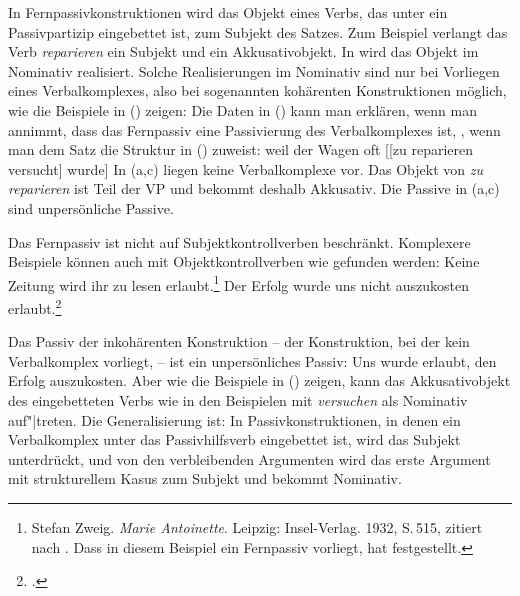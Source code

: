 In Fernpassivkonstruktionen wird das Objekt eines Verbs, das unter ein Passivpartizip eingebettet ist,
zum Subjekt des Satzes. Zum Beispiel verlangt das Verb \emph{reparieren} ein Subjekt und ein Akkusativobjekt.
In  wird das Objekt im Nominativ realisiert.
Solche Realisierungen im Nominativ sind nur bei Vorliegen eines Verbalkomplexes, also bei sogenannten
kohärenten Konstruktionen möglich, wie die Beispiele in () zeigen:
\eal
{}
\zl
Die Daten in () kann man erklären, wenn man annimmt, dass das Fernpassiv eine Passivierung
des Verbalkomplexes ist, \dash, wenn man dem Satz 
die Struktur in () zuweist:
\ea
weil    der Wagen     oft   [[zu reparieren versucht] wurde]
%
\z
In (a,c) liegen keine Verbalkomplexe vor. Das Objekt von \emph{zu reparieren} ist Teil der VP
und bekommt deshalb Akkusativ. Die Passive in (a,c) sind unpersönliche Passive.

Das Fernpassiv ist nicht auf Subjektkontrollverben beschränkt. Komplexere Beispiele
können auch mit Objektkontrollverben wie  gefunden werden:
\eal
\label{bsp-auskosten-fernpassiv}
\ex{}
Keine Zeitung         wird ihr       zu lesen erlaubt.\footnote{
        Stefan Zweig. \emph{Marie Antoinette}. Leipzig: Insel-Verlag. 1932, S.\,515, 
        zitiert nach . 
        Dass in diesem Beispiel ein Fernpassiv vorliegt, hat \citet[]{Askedal88} festgestellt.
}
\ex{}
Der Erfolg        wurde uns      nicht auszukosten erlaubt.\footnote{
        .%
}
\label{bsp-auskosten-fernpassiv-haider}
\zl

\noindent
Das Passiv der inkohärenten Konstruktion -- der Konstruktion, 
bei der kein Verbalkomplex vorliegt, -- ist ein unpersönliches Passiv:
\eas
Uns wurde erlaubt, den Erfolg auszukosten.
\zs
Aber wie die Beispiele in () zeigen, kann das Akkusativobjekt des eingebetteten Verbs
wie in den Beispielen mit \emph{versuchen} als Nominativ auf"|treten.
Die Generalisierung ist: In Passivkonstruktionen, in denen ein Verbalkomplex unter das Passivhilfsverb
eingebettet ist, wird das Subjekt unterdrückt, und von den verbleibenden Argumenten
wird das erste Argument mit strukturellem Kasus
zum Subjekt und bekommt Nominativ.%

